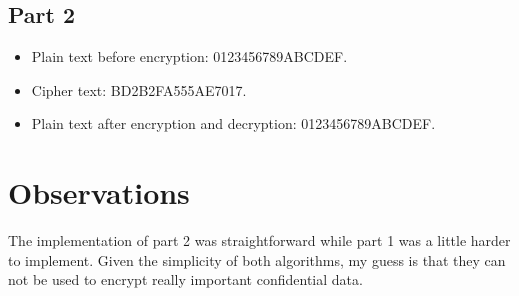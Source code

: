 \documentclass[12pt]{article}
\begin{document}
		\subsection{Part 2}
			\begin{itemize}
				\item Plain text before encryption: 0123456789ABCDEF.	
				\item Cipher text: BD2B2FA555AE7017.
				\item Plain text after encryption and decryption: 0123456789ABCDEF.
			\end{itemize}
		
		\section{Observations}
		The implementation of part 2 was straightforward while part 1 was a little harder to implement. Given the simplicity of both algorithms, my guess is that they can not be used to encrypt really important confidential data.
	
	
\end{document}
